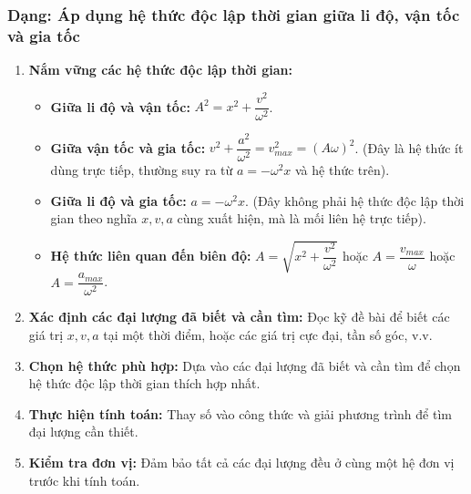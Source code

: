 \subsubsection{Dạng: Áp dụng hệ thức độc lập thời gian giữa li độ, vận tốc và gia tốc}
\begin{phuongphap}
\begin{enumerate}
    \item \textbf{Nắm vững các hệ thức độc lập thời gian:}
    \begin{itemize}
        \item \textbf{Giữa li độ và vận tốc:} $A^2 = x^2 + \dfrac{v^2}{\omega^2}$.
        \item \textbf{Giữa vận tốc và gia tốc:} $v^2 + \dfrac{a^2}{\omega^2} = v_{max}^2 = (A\omega)^2$. (Đây là hệ thức ít dùng trực tiếp, thường suy ra từ $a = -\omega^2 x$ và hệ thức trên).
        \item \textbf{Giữa li độ và gia tốc:} $a = -\omega^2 x$. (Đây không phải hệ thức độc lập thời gian theo nghĩa $x, v, a$ cùng xuất hiện, mà là mối liên hệ trực tiếp).
        \item \textbf{Hệ thức liên quan đến biên độ:} $A = \sqrt{x^2 + \dfrac{v^2}{\omega^2}}$ hoặc $A = \dfrac{v_{max}}{\omega}$ hoặc $A = \dfrac{a_{max}}{\omega^2}$.
    \end{itemize}
    \item \textbf{Xác định các đại lượng đã biết và cần tìm:} Đọc kỹ đề bài để biết các giá trị $x, v, a$ tại một thời điểm, hoặc các giá trị cực đại, tần số góc, v.v.
    \item \textbf{Chọn hệ thức phù hợp:} Dựa vào các đại lượng đã biết và cần tìm để chọn hệ thức độc lập thời gian thích hợp nhất.
    \item \textbf{Thực hiện tính toán:} Thay số vào công thức và giải phương trình để tìm đại lượng cần thiết.
    \item \textbf{Kiểm tra đơn vị:} Đảm bảo tất cả các đại lượng đều ở cùng một hệ đơn vị trước khi tính toán.
\end{enumerate}
\end{phuongphap}
